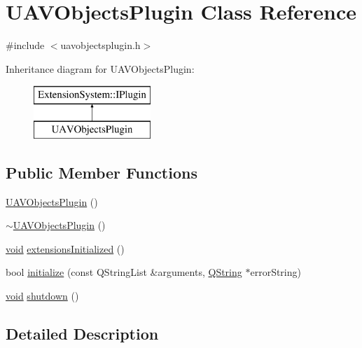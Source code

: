 \hypertarget{class_u_a_v_objects_plugin}{\section{\-U\-A\-V\-Objects\-Plugin \-Class \-Reference}
\label{class_u_a_v_objects_plugin}
}


{\ttfamily \#include $<$uavobjectsplugin.\-h$>$}

\-Inheritance diagram for \-U\-A\-V\-Objects\-Plugin\-:\begin{figure}[H]
\begin{center}
\leavevmode
\includegraphics[height=2.000000cm]{class_u_a_v_objects_plugin}
\end{center}
\end{figure}
\subsection*{\-Public \-Member \-Functions}
\begin{DoxyCompactItemize}
\item 
\hyperlink{group___u_a_v_objects_plugin_ga2345b6b23fc30557f18422344213a64d}{\-U\-A\-V\-Objects\-Plugin} ()
\item 
\hyperlink{group___u_a_v_objects_plugin_ga34b24d065eef797812c717bde15e7252}{$\sim$\-U\-A\-V\-Objects\-Plugin} ()
\item 
\hyperlink{group___u_a_v_objects_plugin_ga444cf2ff3f0ecbe028adce838d373f5c}{void} \hyperlink{group___u_a_v_objects_plugin_ga01c0cfcad9946436827836ba293f07b0}{extensions\-Initialized} ()
\item 
bool \hyperlink{group___u_a_v_objects_plugin_ga782e9362e4a727e032c97865d0841820}{initialize} (const \-Q\-String\-List \&arguments, \hyperlink{group___u_a_v_objects_plugin_gab9d252f49c333c94a72f97ce3105a32d}{\-Q\-String} $\ast$error\-String)
\item 
\hyperlink{group___u_a_v_objects_plugin_ga444cf2ff3f0ecbe028adce838d373f5c}{void} \hyperlink{group___u_a_v_objects_plugin_gab62f36eaf3f542f980ef1d88c29bd05a}{shutdown} ()
\end{DoxyCompactItemize}


\subsection{\-Detailed \-Description}


